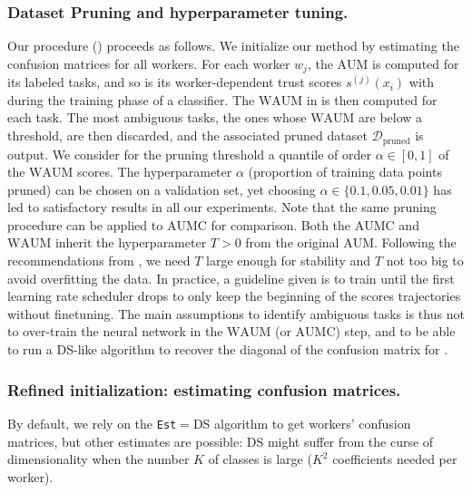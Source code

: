 \subsubsection{Dataset Pruning and hyperparameter tuning.} Our procedure () proceeds as follows.
We initialize our method by estimating the confusion matrices for all workers.
For each worker $w_j$, the $\mathrm{AUM}$ is computed for its labeled tasks, and so is its worker-dependent trust scores $s^{(j)}(x_i)$ with  during the training phase of a classifier.
The $\mathrm{WAUM}$ in  is then computed for each task.
The most ambiguous tasks, the ones whose $\mathrm{WAUM}$ are below a threshold, are then discarded, and the associated pruned dataset $\mathcal{D}_{\text{pruned}}$ is output. We consider for the pruning threshold a quantile of order $\alpha\in[0,1]$ of the $\mathrm{WAUM}$ scores.
The hyperparameter $\alpha$ (proportion of training data points pruned) can be chosen on a validation set, yet choosing $\alpha\in\{0.1, 0.05, 0.01\}$ has led to satisfactory results in all our experiments.
Note that the same pruning procedure can be applied to $\mathrm{AUMC}$ for comparison.
Both the $\mathrm{AUMC}$ and $\mathrm{WAUM}$ inherit the hyperparameter $T>0$ from the original $\mathrm{AUM}$.
Following the recommendations from \citet{pleiss_identifying_2020}, we need $T$ large enough for stability and $T$ not too big to avoid overfitting the data.
In practice, a guideline given is to train until the first learning rate scheduler drops to only keep the beginning of the scores trajectories without finetuning.
The main assumptions to identify ambiguous tasks is thus not to over-train the neural network in the $\mathrm{WAUM}$ (or $\mathrm{AUMC}$) step, and to be able to run a DS-like algorithm to recover the diagonal of the confusion matrix for .

\subsubsection*{Refined initialization: estimating confusion matrices.}
By default, we rely on the \texttt{Est}$=$DS algorithm to get workers' confusion matrices, but other estimates are possible: DS might suffer from the curse of dimensionality when the number $K$ of classes is large ($K^2$ coefficients needed per worker).

